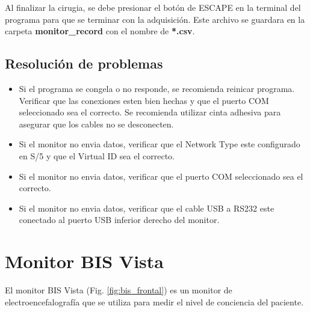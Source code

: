 \documentclass{article}
\begin{document}
Al finalizar la cirugia, se debe presionar el botón de ESCAPE en la terminal del programa para que se terminar con la adquisición. Este archivo se guardara en la carpeta \textbf{monitor\_record} con el nombre de \textbf{*.csv}.


\newpage

\subsection{Resolución de problemas}

\begin{itemize}
	\item Si el programa se congela o no responde, se recomienda reinicar programa. Verificar que las conexiones esten bien hechas y que el puerto COM seleccionado sea el correcto. Se recomienda utilizar cinta adhesiva para asegurar que los cables no se desconecten.
	\item Si el monitor no envia datos, verificar que el Network Type este configurado en S/5 y que el Virtual ID sea el correcto.
	\item Si el monitor no envia datos, verificar que el puerto COM seleccionado sea el correcto.
	\item Si el monitor no envia datos, verificar que el cable USB a RS232 este conectado al puerto USB inferior derecho del monitor.
\end{itemize}



\section{Monitor BIS Vista}

El monitor BIS Vista (Fig. \ref{fig:bis_frontal}) es un monitor de electroencefalografía que se utiliza para medir el nivel de conciencia del paciente. 
\end{document}

